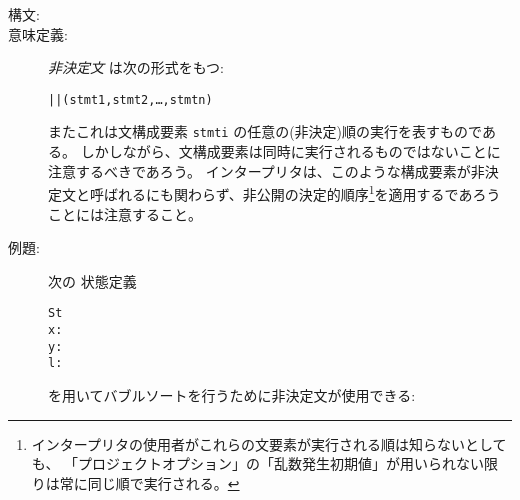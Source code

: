 \documentclass[\pformat,12pt]{jarticle}
\begin{document}
\begin{description}
\item[構文:]
  

\item[意味定義:]  {\it 非決定文} は次の形式をもつ:
  \begin{alltt}
    || (stmt1, stmt2, \ldots, stmtn)
  \end{alltt}
またこれは文構成要素 {\tt  stmti} の任意の(非決定)順の実行を表すものである。
しかしながら、文構成要素は同時に実行されるものではないことに注意するべきであろう。
インタープリタは、このような構成要素が非決定文と呼ばれるにも関わらず、非公開の決定的順序\footnote{インタープリタの使用者がこれらの文要素が実行される順は知らないとしても、 「プロジェクトオプション」の「乱数発生初期値」が用いられない限りは常に同じ順で実行される。}を適用するであろうことには注意すること。

\item[例題:] 次の
状態定義
  \begin{alltt}
   St 
    x:
    y:
    l:
  \end{alltt}
を用いてバブルソートを行うために非決定文が使用できる:


\end{description}
\end{document}
